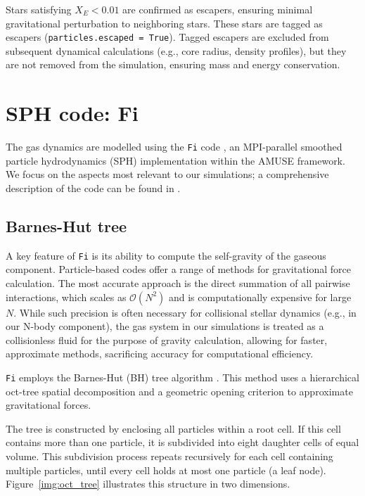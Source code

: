 Stars satisfying $X_E < 0.01$ are confirmed as escapers, ensuring minimal gravitational perturbation to neighboring stars. These stars are tagged as escapers (\texttt{particles.escaped = True}). Tagged escapers are excluded from subsequent dynamical calculations (e.g., core radius, density profiles), but they are not removed from the simulation, ensuring mass and energy conservation.

\section{SPH code: Fi}
\label{sec:3.3}

The gas dynamics are modelled using the \texttt{Fi} code \citep{gerritsen1997star}, an MPI-parallel smoothed particle hydrodynamics (SPH) implementation within the AMUSE framework. We focus on the aspects most relevant to our simulations; a comprehensive description of the code can be found in \citet{pelupessy2005numerical}.

\subsection{Barnes-Hut tree}
\label{subsec:3.3.1_BHTree}

A key feature of \texttt{Fi} is its ability to compute the self-gravity of the gaseous component. Particle-based codes offer a range of methods for gravitational force calculation. The most accurate approach is the direct summation of all pairwise interactions, which scales as $\mathcal{O}(N^2)$ and is computationally expensive for large $N$. While such precision is often necessary for collisional stellar dynamics (e.g., in our N-body component), the gas system in our simulations is treated as a collisionless fluid for the purpose of gravity calculation, allowing for faster, approximate methods, sacrificing accuracy for computational efficiency.

\texttt{Fi} employs the Barnes-Hut (BH) tree algorithm \citep{barnes1986hierarchical}. This method uses a hierarchical oct-tree spatial decomposition and a geometric opening criterion to approximate gravitational forces.

The tree is constructed by enclosing all particles within a root cell. If this cell contains more than one particle, it is subdivided into eight daughter cells of equal volume. This subdivision process repeats recursively for each cell containing multiple particles, until every cell holds at most one particle (a leaf node). Figure~\ref{img:oct_tree} illustrates this structure in two dimensions.

